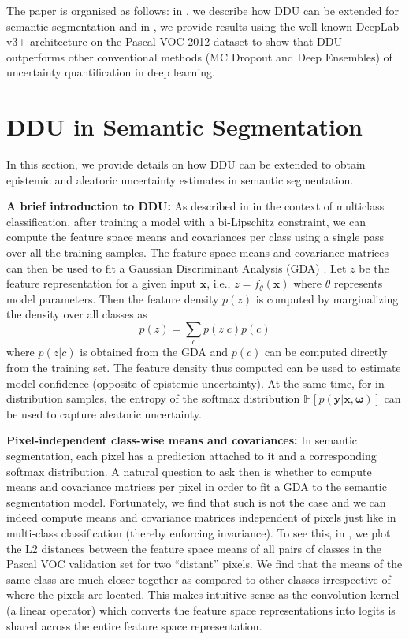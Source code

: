\documentclass{article}
\begin{document}
The paper is organised as follows: in , we describe how DDU can be extended for semantic segmentation and in , we provide results using the well-known DeepLab-v3+ \citep{chen2017rethinking} architecture on the Pascal VOC 2012 \citep{everingham2010pascal} dataset to show that DDU outperforms other conventional methods (MC Dropout and Deep Ensembles) of uncertainty quantification in deep learning.

\section{DDU in Semantic Segmentation}
\label{sec:ddu_semseg}

In this section, we provide details on how DDU can be extended to obtain epistemic and aleatoric uncertainty estimates in semantic segmentation.

\textbf{A brief introduction to DDU:} As described in \citet{mukhoti2021deterministic} in the context of multiclass classification, after training a model with a bi-Lipschitz constraint, we can compute the feature space means and covariances per class using a single pass over all the training samples. The feature space means and covariance matrices can then be used to fit a Gaussian Discriminant Analysis (GDA) \citep{murphy2012machine}. Let $z$ be the feature representation for a given input $\mathbf{x}$, i.e., $z = f_\theta(\mathbf{x})$ where $\theta$ represents model parameters. Then the feature density $p(z)$ is computed by marginalizing the density over all classes as
\begin{equation}
\label{eq:density}
    p(z) = \sum_c p(z|c)p(c)
\end{equation} where $p(z|c)$ is obtained from the GDA and $p(c)$ can be computed directly from the training set. The feature density thus computed can be used to estimate model confidence (opposite of epistemic uncertainty). At the same time, for in-distribution samples, the entropy of the softmax distribution $\mathbb{H}[p(\mathbf{y|x, \omega})]$ can be used to capture aleatoric uncertainty.

\textbf{Pixel-independent class-wise means and covariances:} In semantic segmentation, each pixel has a prediction attached to it and a corresponding softmax distribution. A natural question to ask then is whether to compute means and covariance matrices per pixel in order to fit a GDA to the semantic segmentation model. Fortunately, we find that such is not the case and we can indeed compute means and covariance matrices independent of pixels just like in multi-class classification (thereby enforcing invariance). To see this, in , we plot the L2 distances between the feature space means of all pairs of classes in the Pascal VOC validation set for two ``distant'' pixels. We find that the means of the same class are much closer together as compared to other classes irrespective of where the pixels are located. This makes intuitive sense as the convolution kernel (a linear operator) which converts the feature space representations into logits is shared across the entire feature space representation.
\end{document}
